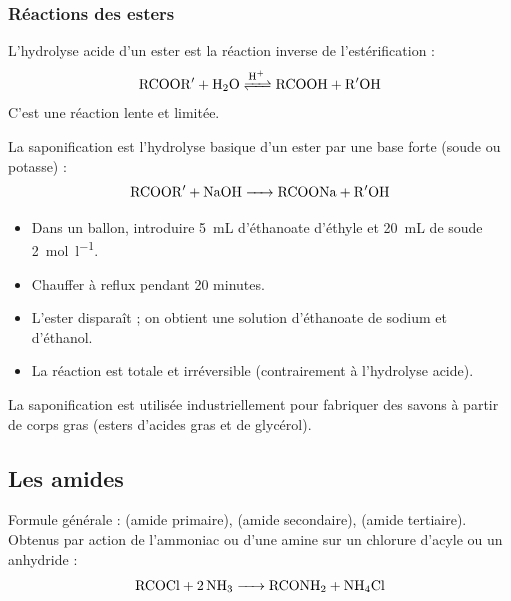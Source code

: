 \subsubsection{Réactions des esters}

\begin{propriete}
L'hydrolyse acide d'un ester est la réaction inverse de l'estérification :
\[
\ce{RCOOR$'$ + H2O <=>[H+] RCOOH + R$'$OH}
\]
C'est une réaction lente et limitée.
\end{propriete}

\begin{propriete}[Saponification]
La saponification est l'hydrolyse basique d'un ester par une base forte (soude ou potasse) :
\[
\ce{RCOOR$'$ + NaOH -> RCOONa + R$'$OH}
\]
\end{propriete}

\begin{experience}[Saponification]
\begin{itemize}
    \item Dans un ballon, introduire \SI{5}{\mL} d'éthanoate d'éthyle et \SI{20}{\mL} de soude \SI{2}{\mol\per\litre}.
    \item Chauffer à reflux pendant 20 minutes.
    \item L'ester disparaît ; on obtient une solution d'éthanoate de sodium et d'éthanol.
    \item La réaction est totale et irréversible (contrairement à l'hydrolyse acide).
\end{itemize}
\end{experience}

\begin{remarque}
La saponification est utilisée industriellement pour fabriquer des savons à partir de corps gras (esters d'acides gras et de glycérol).
\end{remarque}

\subsection{Les amides}

\begin{propriete}[Amides]
Formule générale :  (amide primaire),  (amide secondaire),  (amide tertiaire).
Obtenus par action de l'ammoniac ou d'une amine sur un chlorure d'acyle ou un anhydride :
\[
\ce{RCOCl + 2NH3 -> RCONH2 + NH4Cl}
\]
\end{propriete}


